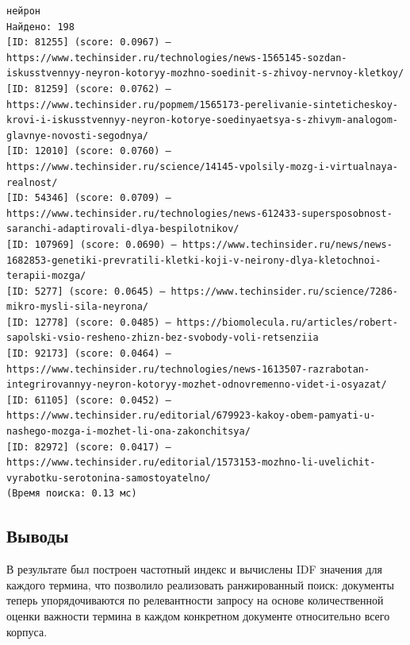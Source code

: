 \documentclass[pdf, unicode, 12pt, a4paper, oneside, fleqn]{article}
\begin{document}
\begin{verbatim}
нейрон
Найдено: 198
[ID: 81255] (score: 0.0967) — https://www.techinsider.ru/technologies/news-1565145-sozdan-iskusstvennyy-neyron-kotoryy-mozhno-soedinit-s-zhivoy-nervnoy-kletkoy/
[ID: 81259] (score: 0.0762) — https://www.techinsider.ru/popmem/1565173-perelivanie-sinteticheskoy-krovi-i-iskusstvennyy-neyron-kotorye-soedinyaetsya-s-zhivym-analogom-glavnye-novosti-segodnya/
[ID: 12010] (score: 0.0760) — https://www.techinsider.ru/science/14145-vpolsily-mozg-i-virtualnaya-realnost/
[ID: 54346] (score: 0.0709) — https://www.techinsider.ru/technologies/news-612433-supersposobnost-saranchi-adaptirovali-dlya-bespilotnikov/       
[ID: 107969] (score: 0.0690) — https://www.techinsider.ru/news/news-1682853-genetiki-prevratili-kletki-koji-v-neirony-dlya-kletochnoi-terapii-mozga/
[ID: 5277] (score: 0.0645) — https://www.techinsider.ru/science/7286-mikro-mysli-sila-neyrona/
[ID: 12778] (score: 0.0485) — https://biomolecula.ru/articles/robert-sapolski-vsio-resheno-zhizn-bez-svobody-voli-retsenziia
[ID: 92173] (score: 0.0464) — https://www.techinsider.ru/technologies/news-1613507-razrabotan-integrirovannyy-neyron-kotoryy-mozhet-odnovremenno-videt-i-osyazat/
[ID: 61105] (score: 0.0452) — https://www.techinsider.ru/editorial/679923-kakoy-obem-pamyati-u-nashego-mozga-i-mozhet-li-ona-zakonchitsya/        
[ID: 82972] (score: 0.0417) — https://www.techinsider.ru/editorial/1573153-mozhno-li-uvelichit-vyrabotku-serotonina-samostoyatelno/
(Время поиска: 0.13 мс)
\end{verbatim}

\subsection*{Выводы}
В результате был построен частотный индекс и вычислены IDF значения для каждого термина, что позволило реализовать ранжированный поиск: документы теперь упорядочиваются по релевантности запросу на основе количественной оценки важности термина в каждом конкретном документе относительно всего корпуса.

\pagebreak





\end{document}
